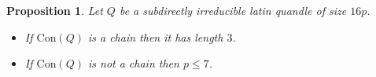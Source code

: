 \documentclass[a4paper, english, 9pt]{amsart}
\theoremstyle{plain}
\newtheorem{proposition}[theorem]{Proposition}
\theoremstyle{definition}
\def\dis{\mathrm{Dis}}
\def\con{\mathrm{Con}}
\def\comment#1{{\color{red} #1}}
\def\Z{\mathbb Z}
\begin{document}
\begin{proposition}\label{chain}
    Let $Q$ be a subdirectly irreducible latin quandle of size $16p$. 
    \begin{itemize}
        \item[(i)] If $\con(Q)$ is a chain then it has length $3$.
        \item[(ii)] If $\con(Q)$ is not a chain then $p\leq 7$.
    \end{itemize}
\end{proposition}




\end{document}
